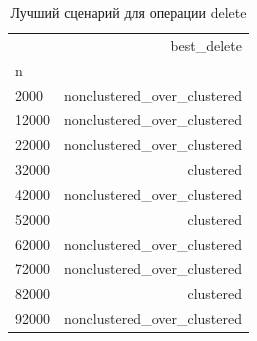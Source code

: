 \begin{table}
\caption{Лучший сценарий для операции delete}
\label{tab:best-delete}
\begin{tabular}{lr}
\toprule
 & best_delete \\
n &  \\
\midrule
2000 & nonclustered_over_clustered \\
12000 & nonclustered_over_clustered \\
22000 & nonclustered_over_clustered \\
32000 & clustered \\
42000 & nonclustered_over_clustered \\
52000 & clustered \\
62000 & nonclustered_over_clustered \\
72000 & nonclustered_over_clustered \\
82000 & clustered \\
92000 & nonclustered_over_clustered \\
\bottomrule
\end{tabular}
\end{table}
